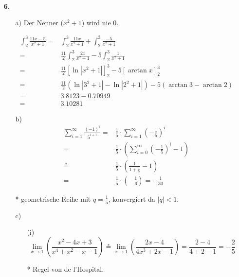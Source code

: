 \documentclass[a4paper,11pt,fleqn]{scrartcl}
\newcommand{\bra}[1]{\left(#1\right)}
\newcommand{\limxn}[2]{\lim\limits_{x \rightarrow #1}\bra{#2}}
\begin{document}
\begin{enumerate}
\item[\textbf{6.}]

    \begin{enumerate}
        \item[a)]
            Der Nenner ($x^2+1$) wird nie 0.

            \begin{align*}
                \int_2^3 \frac{11x-5}{x^2+1} 
                =& \int_2^3 \frac{11x}{x^2+1} + \int_2^3 \frac{-5}{x^2+1} \\
                =& \frac{11}{2} \int_2^3\frac{2x}{x^2+1} - 5 \int_2^3 \frac{1}{x^2+1} \\
                =& \frac{11}{2} \left[\ln\left|x^2+1\right|\right]_2^3 - 5 \left[\arctan x\right]_2^3 \\
                =& \frac{11}{2} \left(\ln\left|3^2+1\right| - \ln\left|2^2+1\right|\right) - 5 \left(\arctan 3 - \arctan 2\right) \\
                =& 3.8123 - 0.70949 \\
                =& 3.10281
            \end{align*}

        \item[b)]
            \begin{align*}
                \sum_{i=1}^\infty \frac{(-1)^i}{5^{i+1}} 
                =& \frac{1}{5} \cdot \sum_{i=1}^\infty (-\frac{1}{5})^i \\
                =& \frac{1}{5} \cdot \left(\sum_{i=0}^\infty (-\frac{1}{5})^i - 1\right) \\
                \overset{*}{=}& \frac{1}{5} \cdot \left( \frac{1}{1+\frac{1}{5}} - 1  \right) \\
                =& \frac{1}{5} \cdot \left( - \frac{1}{6} \right) = - \frac{1}{30}
            \end{align*}

            * geometrische Reihe mit $q=\frac{1}{5}$, konvergiert da $|q|<1$.

        \item[c)]
            \begin{enumerate}
                \item[(i)]
                    \[
                        \limxn{1}{\frac{x^2-4x+3}{x^4+x^2-x-1}} 
                        \overset{*}{=} \limxn{1}{\frac{2x - 4}{4x^3+2x-1}} 
                        = \frac{2 - 4}{4 + 2 - 1} 
                        = -\frac{2}{5}
                    \]

                    * Regel von de l'Hospital.


\end{enumerate}
\end{enumerate}
\end{enumerate}
\end{document}
